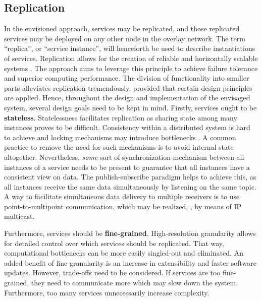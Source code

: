 \subsection{Replication}
In the envisioned approach, services may be replicated, and those replicated services may be deployed on any other node in the overlay network. The term ``replica'', or ``service instance'', will henceforth be used to describe instantiations of services. Replication allows for the creation of reliable and horizontally scalable systems \cite{tanenbaum2017distributed}. The approach aims to leverage this principle to achieve failure tolerance and superior computing performance.
The division of functionality into smaller parts alleviates replication tremendously, provided that certain design principles are applied. Hence, throughout the design and implementation of the envisaged system, several design goals need to be kept in mind. Firstly, services ought to be \textbf{stateless}. Statelessness facilitates replication as sharing state among many instances proves to be difficult. Consistency within a distributed system is hard to achieve and locking mechanisms may introduce bottlenecks \cite{tanenbaum2017distributed}. A common practice to remove the need for such mechanisms is to avoid internal state altogether.
Nevertheless, \emph{some} sort of synchronization mechanism between all instances of a service needs to be present to guarantee that all instances have a consistent view on data. The publish-subscribe paradigm helps to achieve this, as all instances receive the same data simultaneously by listening on the same topic. A way to facilitate simultaneous data delivery to multiple receivers is to use point-to-multipoint communication, which may be realized, \eg , by means of IP multicast.

Furthermore, services should be \textbf{fine-grained}. High-resolution granularity allows for detailed control over which services should be replicated. That way, computational bottlenecks can be more easily singled-out and eliminated. An added benefit of fine granularity is an increase in extensibility and faster software updates. However, trade-offs need to be considered. If services are too fine-grained, they need to communicate more which may slow down the system. Furthermore, too many services unnecessarily increase complexity.


